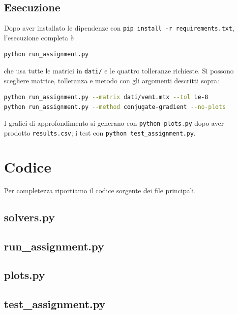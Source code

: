 \documentclass[11pt,a4paper]{article}
\begin{document}
\subsection{Esecuzione}
Dopo aver installato le dipendenze con \texttt{pip install -r requirements.txt},
l'esecuzione completa è
\begin{lstlisting}[language=bash]
python run_assignment.py
\end{lstlisting}
che usa tutte le matrici in \texttt{dati/} e le quattro tolleranze richieste. Si
possono scegliere matrice, tolleranza e metodo con gli argomenti descritti sopra:
\begin{lstlisting}[language=bash]
python run_assignment.py --matrix dati/vem1.mtx --tol 1e-8
python run_assignment.py --method conjugate-gradient --no-plots
\end{lstlisting}
I grafici di approfondimento si generano con \texttt{python plots.py} dopo aver
prodotto \texttt{results.csv}; i test con
\texttt{python test\_assignment.py}.

\section{Codice}\label{sec:codice}
Per completezza riportiamo il codice sorgente dei file principali.

\subsection{solvers.py}


\subsection{run\_assignment.py}


\subsection{plots.py}


\subsection{test\_assignment.py}

\end{document}
